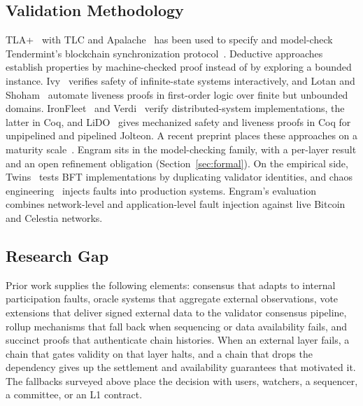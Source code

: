 \subsection{Validation Methodology}
\label{subsec:rw-validation}
TLA+~\cite{lamport2002specifying} with TLC and
Apalache~\cite{konnov2019apalache} has been used to specify and model-check
Tendermint's blockchain synchronization protocol~\cite{braithwaite2020tendermint}. Deductive approaches establish properties by machine-checked proof instead of
by exploring a bounded instance. Ivy~\cite{padon2016ivy} verifies safety of
infinite-state systems interactively, and Lotan and
Shoham~\cite{lotan2025implicit} automate liveness proofs in first-order logic
over finite but unbounded domains. IronFleet~\cite{hawblitzel2015ironfleet} and
Verdi~\cite{wilcox2015verdi} verify distributed-system implementations, the
latter in Coq, and LiDO~\cite{qiu2024lido} gives mechanized safety and
liveness proofs in Coq for unpipelined and pipelined Jolteon. A recent
preprint places these approaches on a maturity
scale~\cite{bondarev2026sok}. Engram sits in the model-checking family, with a
per-layer result and an open refinement obligation
(Section~\ref{sec:formal}). On the empirical side, Twins~\cite{bano2021twins}
tests BFT implementations by duplicating validator identities, and chaos
engineering~\cite{basiri2016chaos} injects faults into production systems.
Engram's evaluation combines network-level and application-level fault
injection against live Bitcoin and Celestia networks.

\subsection{Research Gap}
\label{subsec:rw-gap}
Prior work supplies the following elements: consensus that adapts to internal
participation faults, oracle systems that aggregate external observations,
vote extensions that deliver signed external data to the validator consensus
pipeline, rollup mechanisms that fall back when sequencing or data availability
fails, and succinct proofs that authenticate chain histories. When an external
layer fails, a chain that gates validity on that layer halts, and a chain that
drops the dependency gives up the settlement and availability guarantees that
motivated it. The fallbacks surveyed above place the decision with users,
watchers, a sequencer, a committee, or an L1 contract.

